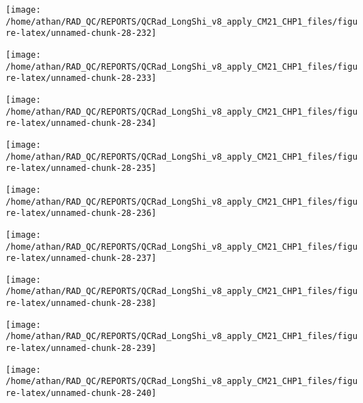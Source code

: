 \documentclass[
  10pt,
  a4paper,oneside]{article}
\begin{document}
\begin{center}\texttt{[image: /home/athan/RAD\_QC/REPORTS/QCRad\_LongShi\_v8\_apply\_CM21\_CHP1\_files/figure-latex/unnamed-chunk-28-232]} \end{center}

\begin{center}\texttt{[image: /home/athan/RAD\_QC/REPORTS/QCRad\_LongShi\_v8\_apply\_CM21\_CHP1\_files/figure-latex/unnamed-chunk-28-233]} \end{center}

\begin{center}\texttt{[image: /home/athan/RAD\_QC/REPORTS/QCRad\_LongShi\_v8\_apply\_CM21\_CHP1\_files/figure-latex/unnamed-chunk-28-234]} \end{center}

\begin{center}\texttt{[image: /home/athan/RAD\_QC/REPORTS/QCRad\_LongShi\_v8\_apply\_CM21\_CHP1\_files/figure-latex/unnamed-chunk-28-235]} \end{center}

\begin{center}\texttt{[image: /home/athan/RAD\_QC/REPORTS/QCRad\_LongShi\_v8\_apply\_CM21\_CHP1\_files/figure-latex/unnamed-chunk-28-236]} \end{center}

\begin{center}\texttt{[image: /home/athan/RAD\_QC/REPORTS/QCRad\_LongShi\_v8\_apply\_CM21\_CHP1\_files/figure-latex/unnamed-chunk-28-237]} \end{center}

\begin{center}\texttt{[image: /home/athan/RAD\_QC/REPORTS/QCRad\_LongShi\_v8\_apply\_CM21\_CHP1\_files/figure-latex/unnamed-chunk-28-238]} \end{center}

\begin{center}\texttt{[image: /home/athan/RAD\_QC/REPORTS/QCRad\_LongShi\_v8\_apply\_CM21\_CHP1\_files/figure-latex/unnamed-chunk-28-239]} \end{center}

\begin{center}\texttt{[image: /home/athan/RAD\_QC/REPORTS/QCRad\_LongShi\_v8\_apply\_CM21\_CHP1\_files/figure-latex/unnamed-chunk-28-240]} \end{center}
\end{document}
